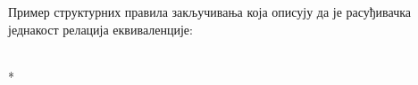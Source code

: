 \documentclass[12pt,oneside]{memoir}
\begin{document}
Пример структурних правила закључивања која описују да је расуђивачка једнакост релација еквиваленције:

\begin{samepage}
    \begin{center}
        \begin{minipage}{.2\textwidth}
            \begin{prooftree}
            \end{prooftree}
        \end{minipage}
        \begin{minipage}{.25\textwidth}
            \begin{prooftree}
            \end{prooftree}
        \end{minipage}
        \begin{minipage}{.5\textwidth}
            \begin{prooftree}
            \end{prooftree}
        \end{minipage}
        \\*
        \bigskip\
        \begin{minipage}{.2\textwidth}
            \begin{prooftree}
            \end{prooftree}
        \end{minipage}
        \begin{minipage}{.25\textwidth}
            \begin{prooftree}
            \end{prooftree}
        \end{minipage}
        \begin{minipage}{.5\textwidth}
            \begin{prooftree}
            \end{prooftree}
        \end{minipage}
    \end{center}
\end{samepage}
\end{document}
